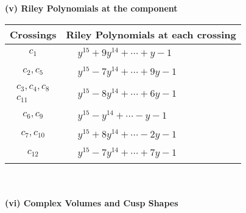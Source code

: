 \documentclass[1p]{elsarticle_modified}
\theoremstyle{definition}
\begin{document}
\newpage\renewcommand{\arraystretch}{1}
\flushleft \textbf{(v) Riley Polynomials at the component}\newline \\
\begin{tabular}{m{50pt}|m{274pt}}
Crossings & \hspace{64pt}Riley Polynomials at each crossing \\
\hline $$\begin{aligned}c_{1}\end{aligned}$$&$\begin{aligned}
&y^{15}+9 y^{14}+\cdots+y-1
\end{aligned}$\\
\hline $$\begin{aligned}c_{2},c_{5}\end{aligned}$$&$\begin{aligned}
&y^{15}-7 y^{14}+\cdots+9 y-1
\end{aligned}$\\
\hline $$\begin{aligned}c_{3},c_{4},c_{8}\\c_{11}\end{aligned}$$&$\begin{aligned}
&y^{15}-8 y^{14}+\cdots+6 y-1
\end{aligned}$\\
\hline $$\begin{aligned}c_{6},c_{9}\end{aligned}$$&$\begin{aligned}
&y^{15}- y^{14}+\cdots- y-1
\end{aligned}$\\
\hline $$\begin{aligned}c_{7},c_{10}\end{aligned}$$&$\begin{aligned}
&y^{15}+8 y^{14}+\cdots-2 y-1
\end{aligned}$\\
\hline $$\begin{aligned}c_{12}\end{aligned}$$&$\begin{aligned}
&y^{15}-7 y^{14}+\cdots+7 y-1
\end{aligned}$\\
\hline
\end{tabular}\\~\\
\newpage\flushleft \textbf{(vi) Complex Volumes and Cusp Shapes}
\end{document}
